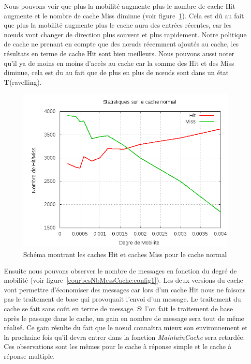 \par Nous pouvons voir que plus la mobilité augmente plus le nombre de cache Hit augmente et le nombre de cache Miss diminue (voir figure~\ref{courbesHitMiss:config1}). Cela est dû au fait que plus la mobilité augmente plus le cache aura des entrées récentes, car les nœuds vont changer de direction plus souvent et plus rapidement. Notre politique de cache ne prenant en compte que des nœuds récemment ajoutés au cache, les résultats en terme de cache Hit sont bien meilleurs. Nous pouvons aussi noter qu'il ya de moins en moins d'accès au cache car la somme des Hit et des Miss diminue, cela est du au fait que de plus en plus de nœuds sont dans un état \textbf{T}(ravelling). 

	\begin{figure}[!h]
        \centering
        \includegraphics[scale=0.5]{../CacheCode/SolipsisPeersim/resultats/Courbes/Courbes_Final_Rapport/Cache_Stats_Normal.png}
        \caption{Schéma montrant les caches Hit et caches Miss pour le cache normal}
        \label{courbesHitMiss:config1}
        \end{figure}
\newpage
\par Ensuite nous pouvons observer le nombre de messages en fonction du degré de mobilité (voir figure~\ref{courbesNbMessCache:config1}). Les deux versions du cache vont permettre d'économiser des messages car lors d'un cache Hit nous ne faisons pas le traitement de base qui provoquait l'envoi d'un message. Le traitement du cache se fait sans coût en terme de message. Si l'on fait le traitement de base après le passage dans le cache, un gain en nombre de message sera tout de même réalisé. Ce gain résulte du fait que le nœud connaîtra mieux son environnement et la prochaine fois qu'il devra entrer dans la fonction \textit{MaintainCache} sera retardée. Ces observations sont les mêmes pour le cache à réponse simple et le cache à réponse multiple.  


